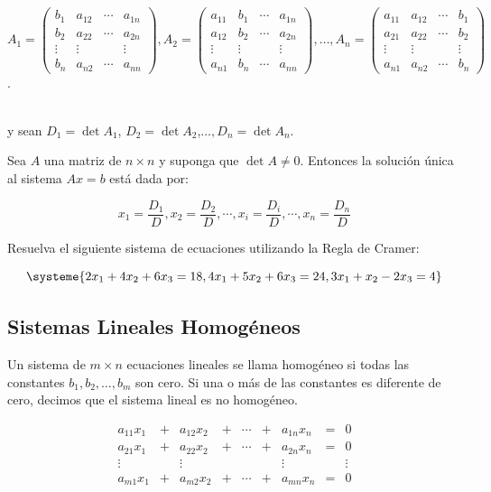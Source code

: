 $A_1 = \begin{pmatrix} b_1 & a_{12} & \cdots & a_{1n} \\ b_2 & a_{22} & \cdots & a_{2n} \\ \vdots & \vdots & & \vdots \\ b_n & a_{n2} & \cdots & a_{nn} \end{pmatrix}, A_2 = \begin{pmatrix} a_{11} & b_1 & \cdots & a_{1n} \\ a_{12} & b_2 & \cdots & a_{2n} \\ \vdots & \vdots & & \vdots \\ a_{n1} & b_n & \cdots & a_{nn} \end{pmatrix}, \dots, A_n = \begin{pmatrix} a_{11} & a_{12} & \cdots & b_1 \\ a_{21} & a_{22} & \cdots & b_2 \\ \vdots & \vdots & & \vdots \\ a_{n1} & a_{n2} & \cdots & b_n \end{pmatrix}$.
\\\

y sean $D_1 = \det A_1$, $D_2 = \det A_2$,$\dots, D_n = \det A_n$.


\begin{thm}
Sea $A$ una matriz de $n \times n$ y suponga que $\det A \not= 0$. Entonces la solución única al sistema $Ax = b$ está dada por:

$$x_1 = \frac{D_1}{D}, x_2 = \frac{D_2}{D}, \cdots, x_i = \frac{D_i}{D}, \cdots, x_n = \frac{D_n}{D}$$
\end{thm}


\begin{ejer}
Resuelva el siguiente sistema de ecuaciones utilizando la Regla de Cramer:

\begin{equation*}
\systeme{
2x_1+4x_2+6x_3=18,
4x_1+5x_2+6x_3=24,
3x_1+x_2-2x_3=4
}
\end{equation*}

\end{ejer}

\subsection{Sistemas Lineales Homogéneos}
\begin{defin}
Un sistema de $m \times n$ ecuaciones lineales se llama homogéneo si todas las constantes $b_1,b_2, \dots , b_m$ son cero. Si una o más de las constantes es diferente de cero, decimos que el sistema lineal es no homogéneo.

$$\begin{matrix} a_{11}x_1 &+ & a_{12}x_2 & + & \cdots & + & a_{1n}x_n & = & 0 \\ a_{21}x_1 & + & a_{22}x_2 & + & \cdots & + & a_{2n}x_n & = & 0 \\ \vdots & & \vdots & & &  & \vdots & & \vdots \\ a_{m1}x_1 & + & a_{m2}x_2 & + & \cdots & + & a_{mn}x_n & = & 0 \end{matrix}$$
\end{defin}

